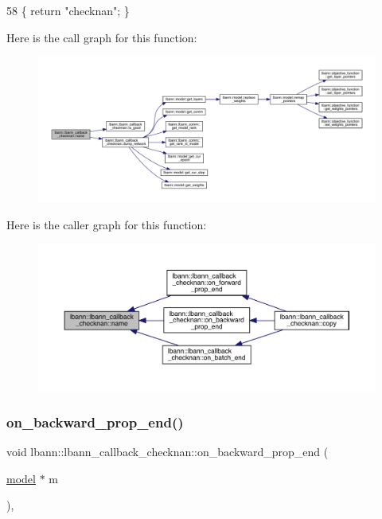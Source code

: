 \begin{DoxyCode}
58 \{ \textcolor{keywordflow}{return} \textcolor{stringliteral}{"checknan"}; \}
\end{DoxyCode}
Here is the call graph for this function\+:\nopagebreak
\begin{figure}[H]
\begin{center}
\leavevmode
\includegraphics[width=350pt]{classlbann_1_1lbann__callback__checknan_ab42c997a06058c3535792408fdd5fed8_cgraph}
\end{center}
\end{figure}
Here is the caller graph for this function\+:\nopagebreak
\begin{figure}[H]
\begin{center}
\leavevmode
\includegraphics[width=350pt]{classlbann_1_1lbann__callback__checknan_ab42c997a06058c3535792408fdd5fed8_icgraph}
\end{center}
\end{figure}
\mbox{\label{classlbann_1_1lbann__callback__checknan_a40d9a9fcc5849746570b99321e1c5488}} 
\subsubsection{\texorpdfstring{on\+\_\+backward\+\_\+prop\+\_\+end()}{on\_backward\_prop\_end()}}
{\footnotesize\ttfamily void lbann\+::lbann\+\_\+callback\+\_\+checknan\+::on\+\_\+backward\+\_\+prop\+\_\+end (\begin{DoxyParamCaption}\item[{\hyperlink{classlbann_1_1model}{model} $\ast$}]{m }\end{DoxyParamCaption})\hspace{0.3cm}{\ttfamily [override]}, {\ttfamily [virtual]}}

